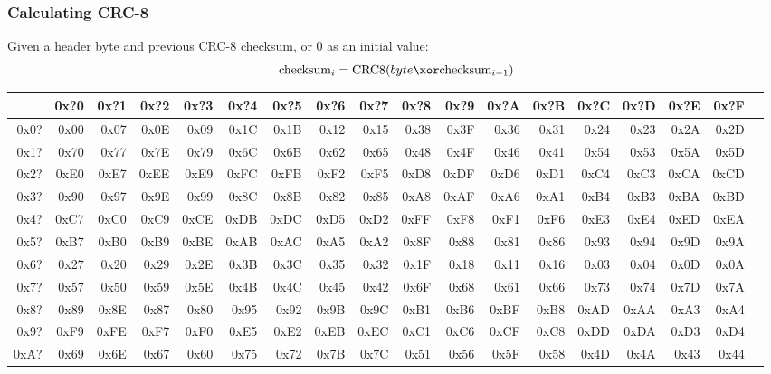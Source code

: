 \clearpage

\subsubsection{Calculating CRC-8}
\label{flac:calculate_crc8}
Given a header byte and previous CRC-8 checksum,
or 0 as an initial value:
\begin{equation*}
\text{checksum}_i = \text{CRC8}(byte\xor\text{checksum}_{i - 1})
\end{equation*}
\begin{table}[h]
{\ttfamily
\begin{tabular}{|r||r|r|r|r|r|r|r|r|r|r|r|r|r|r|r|r|r|}
\hline
 & 0x?0 & 0x?1 & 0x?2 & 0x?3 & 0x?4 & 0x?5 & 0x?6 & 0x?7 & 0x?8 & 0x?9 & 0x?A & 0x?B & 0x?C & 0x?D & 0x?E & 0x?F \\
\hline
0x0? & 0x00 & 0x07 & 0x0E & 0x09 & 0x1C & 0x1B & 0x12 & 0x15 & 0x38 & 0x3F & 0x36 & 0x31 & 0x24 & 0x23 & 0x2A & 0x2D \\
0x1? & 0x70 & 0x77 & 0x7E & 0x79 & 0x6C & 0x6B & 0x62 & 0x65 & 0x48 & 0x4F & 0x46 & 0x41 & 0x54 & 0x53 & 0x5A & 0x5D \\
0x2? & 0xE0 & 0xE7 & 0xEE & 0xE9 & 0xFC & 0xFB & 0xF2 & 0xF5 & 0xD8 & 0xDF & 0xD6 & 0xD1 & 0xC4 & 0xC3 & 0xCA & 0xCD \\
0x3? & 0x90 & 0x97 & 0x9E & 0x99 & 0x8C & 0x8B & 0x82 & 0x85 & 0xA8 & 0xAF & 0xA6 & 0xA1 & 0xB4 & 0xB3 & 0xBA & 0xBD \\
0x4? & 0xC7 & 0xC0 & 0xC9 & 0xCE & 0xDB & 0xDC & 0xD5 & 0xD2 & 0xFF & 0xF8 & 0xF1 & 0xF6 & 0xE3 & 0xE4 & 0xED & 0xEA \\
0x5? & 0xB7 & 0xB0 & 0xB9 & 0xBE & 0xAB & 0xAC & 0xA5 & 0xA2 & 0x8F & 0x88 & 0x81 & 0x86 & 0x93 & 0x94 & 0x9D & 0x9A \\
0x6? & 0x27 & 0x20 & 0x29 & 0x2E & 0x3B & 0x3C & 0x35 & 0x32 & 0x1F & 0x18 & 0x11 & 0x16 & 0x03 & 0x04 & 0x0D & 0x0A \\
0x7? & 0x57 & 0x50 & 0x59 & 0x5E & 0x4B & 0x4C & 0x45 & 0x42 & 0x6F & 0x68 & 0x61 & 0x66 & 0x73 & 0x74 & 0x7D & 0x7A \\
0x8? & 0x89 & 0x8E & 0x87 & 0x80 & 0x95 & 0x92 & 0x9B & 0x9C & 0xB1 & 0xB6 & 0xBF & 0xB8 & 0xAD & 0xAA & 0xA3 & 0xA4 \\
0x9? & 0xF9 & 0xFE & 0xF7 & 0xF0 & 0xE5 & 0xE2 & 0xEB & 0xEC & 0xC1 & 0xC6 & 0xCF & 0xC8 & 0xDD & 0xDA & 0xD3 & 0xD4 \\
0xA? & 0x69 & 0x6E & 0x67 & 0x60 & 0x75 & 0x72 & 0x7B & 0x7C & 0x51 & 0x56 & 0x5F & 0x58 & 0x4D & 0x4A & 0x43 & 0x44 \\

\end{tabular}}
\end{table}

